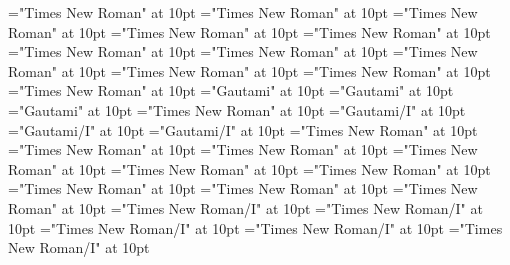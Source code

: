 \documentclass[a4paper]{article}
\begin{document}
\font\aentryrefcomponentprimaryrefsentryletDatadicBody="Times New Roman" at 10pt
\font\entryrefcomponentprimaryrefsentryletDatadicBody="Times New Roman" at 10pt
\font\spanenspanenentryreftypeprimaryrefsentryletDatadicBody="Times New Roman" at 10pt
\font\LexEntryTypepublishStemEntryTypeAbbreviationPubafterentryreftypeprimaryrefsentryletDatadicBody="Times New Roman" at 10pt
\font\spanenentryreftypeprimaryrefsentryletDatadicBody="Times New Roman" at 10pt
\font\entryreftypeafterprimaryrefsentryletDatadicBody="Times New Roman" at 10pt
\font\entryreftypeprimaryrefsentryletDatadicBody="Times New Roman" at 10pt
\font\primaryrefsafterentryletDatadicBody="Times New Roman" at 10pt
\font\primaryrefsbeforeentryletDatadicBody="Times New Roman" at 10pt
\font\primaryrefsentryletDatadicBody="Times New Roman" at 10pt
\font\xitemxitemexamplesbeforeexamplessensesensesentryletDatadicBody="Times New Roman" at 10pt
\font\spantetranslationLdtranslationsxitemexamplessensesensesentryletDatadicBody="Gautami" at 10pt
\font\translationLdaftertranslationsxitemexamplessensesensesentryletDatadicBody="Gautami" at 10pt
\font\translationLdtranslationsxitemexamplessensesensesentryletDatadicBody="Gautami" at 10pt
\font\translationsxitemexamplessensesensesentryletDatadicBody="Times New Roman" at 10pt
\font\spanggoTeluINexamplexitemexamplessensesensesentryletDatadicBody="Gautami/I" at 10pt
\font\exampleafterxitemexamplessensesensesentryletDatadicBody="Gautami/I" at 10pt
\font\examplexitemexamplessensesensesentryletDatadicBody="Gautami/I" at 10pt
\font\xitemexamplessensesensesentryletDatadicBody="Times New Roman" at 10pt
\font\examplesaftersensesensesentryletDatadicBody="Times New Roman" at 10pt
\font\examplessensesensesentryletDatadicBody="Times New Roman" at 10pt
\font\xsensenumberaftersensesentryletDatadicBody="Times New Roman" at 10pt
\font\xsensenumbersensesentryletDatadicBody="Times New Roman" at 10pt
\font\LexSensepublishStemGlossPubaftersensesensesentryletDatadicBody="Times New Roman" at 10pt
\font\spanenspanensensesensesentryletDatadicBody="Times New Roman" at 10pt
\font{}="Times New Roman" at 10pt
\font\spanensensesensesentryletDatadicBody="Times New Roman" at 10pt
\font\spanenspanengrammaticalinfosensesensesentryletDatadicBody="Times New Roman/I" at 10pt
\font\partofspeechaftergrammaticalinfosensesensesentryletDatadicBody="Times New Roman/I" at 10pt
\font\spanengrammaticalinfosensesensesentryletDatadicBody="Times New Roman/I" at 10pt
\font\grammaticalinfoaftersensesensesentryletDatadicBody="Times New Roman/I" at 10pt
\font\grammaticalinfosensesensesentryletDatadicBody="Times New Roman/I" at 10pt
\end{document}

